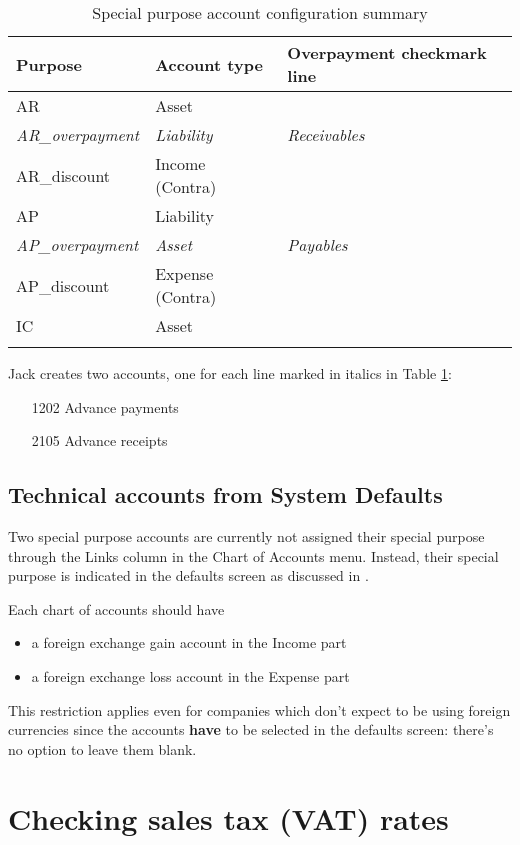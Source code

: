 \begin{longtable}{lll}
Purpose & Account type & Overpayment checkmark line \\ \hline
\endhead
AR & Asset &  \\
\textit{AR\_overpayment} & \textit{Liability} & \textit{Receivables} \\
AR\_discount & Income (Contra) &  \\
AP & Liability &  \\
\textit{AP\_overpayment} & \textit{Asset} & \textit{Payables} \\
AP\_discount & Expense (Contra) & \\
IC & Asset &  \\
\caption{Special purpose account configuration summary}
\label{tbl:special-purpose-account-config-summary}
\end{longtable}

Jack creates two accounts, one for each line marked in italics in Table \ref{tbl:special-purpose-account-config-summary}:
\begin{itemize}
\item [1202] Advance payments
\item [2105] Advance receipts
\end{itemize}


\subsection{Technical accounts from System Defaults}
\label{subsec-first-login-technical-accounts-defaults}

Two special purpose accounts are currently not assigned their special purpose through
the Links column in the Chart of Accounts menu. Instead, their special purpose is indicated
in the defaults screen as discussed in .

Each chart of accounts should have
\begin{itemize}
\item a foreign exchange gain account in the Income part
\item a foreign exchange loss account in the Expense part
\end{itemize}

This restriction applies even for companies which don't expect to be using foreign currencies
since the accounts \textbf{have} to be selected in the defaults screen: there's no option
to leave them blank.

\section{Checking sales tax (VAT) rates}

